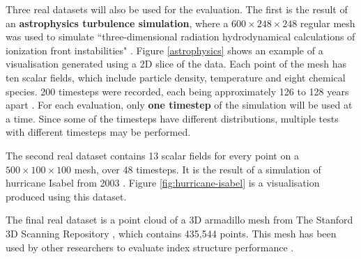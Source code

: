 Three real datasets will also be used for the evaluation. The first is the result of an \textbf{astrophysics turbulence simulation}, where a $600 \times 248 \times 248$ regular mesh was used to simulate ``three-dimensional radiation hydrodynamical calculations of ionization front instabilities" \cite{astrophysics-dataset}. Figure \ref{astrophysics} shows an example of a visualisation generated using a 2D slice of the data. Each point of the mesh has ten scalar fields, which include particle density, temperature and eight chemical species. 200 timesteps were recorded, each being approximately 126 to 128 years apart \cite{astrophysics-dataset}. For each evaluation, only \textbf{one timestep} of the simulation will be used at a time. Since some of the timesteps have different distributions, multiple tests with different timesteps may be performed.

The second real dataset contains 13 scalar fields for every point on a $500 \times 100 \times 100$ mesh, over 48 timesteps. It is the result of a simulation of hurricane Isabel from 2003 \cite{hurricane-isabel-dataset}. Figure \ref{fig:hurricane-isabel} is a visualisation produced using this dataset.

The final real dataset is a point cloud of a 3D armadillo mesh from The Stanford 3D Scanning Repository \cite{armadillo-mesh}, which contains 435,544 points. This mesh has been used by other researchers to evaluate index structure performance \cite{kd-tree-gpu, accelerating-kdtree-nn}.


